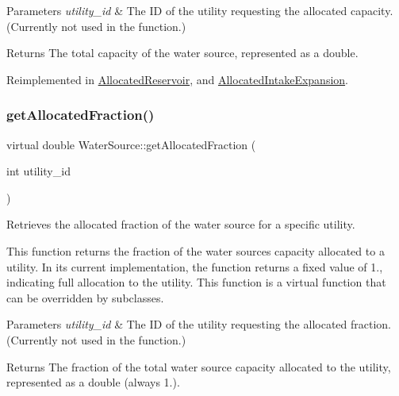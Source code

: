 \begin{DoxyParams}{Parameters}
{\em utility\+\_\+id} & The ID of the utility requesting the allocated capacity. (Currently not used in the function.)\\
\hline
\end{DoxyParams}
\begin{DoxyReturn}{Returns}
The total capacity of the water source, represented as a double. 
\end{DoxyReturn}


Reimplemented in \mbox{\hyperlink{classAllocatedReservoir_a8b9b38494fa23f0bea78134c82644bf1}{Allocated\+Reservoir}}, and \mbox{\hyperlink{classAllocatedIntakeExpansion_a6cd2dabeb1dc1e0417082c032620ce51}{Allocated\+Intake\+Expansion}}.

\mbox{\label{classWaterSource_acec9b1fef81a9b73c4517409438452ac}} 
\subsubsection{\texorpdfstring{get\+Allocated\+Fraction()}{getAllocatedFraction()}}
{\footnotesize\ttfamily virtual double Water\+Source\+::get\+Allocated\+Fraction (\begin{DoxyParamCaption}\item[{int}]{utility\+\_\+id }\end{DoxyParamCaption})\hspace{0.3cm}{\ttfamily [virtual]}}



Retrieves the allocated fraction of the water source for a specific utility. 

This function returns the fraction of the water source\textquotesingle{}s capacity allocated to a utility. In its current implementation, the function returns a fixed value of 1., indicating full allocation to the utility. This function is a virtual function that can be overridden by subclasses.


\begin{DoxyParams}{Parameters}
{\em utility\+\_\+id} & The ID of the utility requesting the allocated fraction. (Currently not used in the function.)\\
\hline
\end{DoxyParams}
\begin{DoxyReturn}{Returns}
The fraction of the total water source capacity allocated to the utility, represented as a double (always 1.). 
\end{DoxyReturn}


